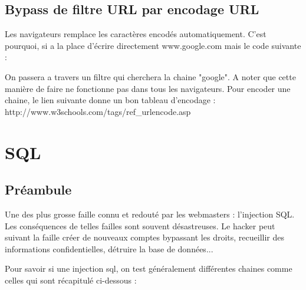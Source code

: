 \documentclass{article}
\begin{document}
\subsection{Bypass de filtre URL par encodage URL}

Les navigateurs remplace les caractères encodés automatiquement. C'est pourquoi, si a la place d'écrire directement www.google.com mais le code suivante :
\vspace{0.2cm}\\
\vspace{0.2cm} 

On passera a travers un filtre qui cherchera la chaine "google". A noter que cette manière de faire ne fonctionne pas dans tous les navigateurs. Pour encoder une chaine, le lien suivante donne un bon tableau d'encodage : http://www.w3schools.com/tags/ref\_urlencode.asp


\newpage
\section{SQL}
\subsection{Préambule}
Une des plus grosse faille connu et redouté par les webmasters : l'injection SQL. Les conséquences de telles failles sont souvent désastreuses. Le hacker peut suivant la faille créer de nouveaux comptes bypassant les droits, recueillir des informations confidentielles, détruire la base de données...

Pour savoir si une injection sql, on test généralement différentes chaines comme celles qui sont récapitulé ci-dessous :
\vspace{0.2cm}\\
\vspace{0.2cm}
\end{document}

